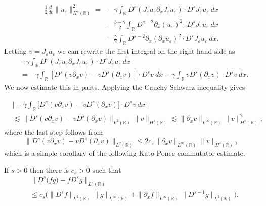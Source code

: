 \documentclass{beamer}
\newcommand{\rr}{\mathbb{R}}
\newcommand{\p}{\partial}
\newcommand{\ee}{\varepsilon}
\begin{document}
\begin{frame}
%
%
%
\begin{equation*} \begin{split}
\label{B-moli-int}
\frac 12
\frac{d}{dt} \|u_\ee \|_{H^s(\rr)}^2
=
& -
\gamma \int_{\rr}  D^s(J_\ee u_\ee \partial_x J_\ee u_\ee) \cdot
D^s J_\ee u_\ee  \  dx
\\
&- \frac{3 -\gamma}{2} \int_{\rr} D^{s-2} \p_x (u_{\ee})^2 \cdot D^s J_\ee 
u_{\ee} \ dx
\\
& - \frac{\gamma}{2} \int_{\rr}  D^{s-2} \p_x (\p_x u_\ee)^2
\cdot D^s J_\ee u_\ee  \ dx.
\end{split}
\end{equation*}
%
%
%
Letting $v=J_\ee u_\ee$ we can rewrite the first integral on the right-hand 
side as 
%
%
%
\begin{equation*} \begin{split}
\label{B-moli-int-v}
& -  \gamma \int_{\rr}   D^s (J_{\ee} u_{\ee} \p_x J_\ee u_\ee)
\cdot D^s
J_{\ee}u_\ee \ dx
\\
& = - \gamma \int_\rr
\left [ D^s(v\p_x v)  -  v D^s (\p_xv)
\right ] \cdot D^s v \ dx
- \gamma \int_\rr
v D^s (\p_xv) 
\cdot D^s v \ dx.
\end{split}
\end{equation*}
%
%
%
%
%
We now estimate this in parts. Applying the Cauchy-Schwarz 
inequality gives
%
%
%
\end{frame}

\begin{frame}

\begin{equation*} \label{int1-est-calc2}
\begin{split}
& \Big|
- \gamma \int_\rr
\big[ D^s(v\p_x v)  -  v D^s (\p_xv)
\big]
\cdot D^s v   \, dx
\Big|
\\
& \lesssim
\|
D^s(v\p_x v)  -  v D^s (\p_xv)
\|_{L^2(\rr)}
\|
v
\|_{H^s(\rr)}
\lesssim \| \p_x v \|_{L^\infty(\rr)} \| v \|_{H^s(\rr)}^2,
\end{split}
\end{equation*}
%
%
%
where the last step follows from 
%
%
%
\begin{equation*} \label{int1-est-calc3}
\| D^s(v\p_x v)  -  v D^s (\p_xv) \|_{L^2(\rr)}
\le
2 c_s    \| \p_x v \|_{L^\infty(\rr)} \| v \|_{H^s(\rr)},
\end{equation*}
%
%
which is a simple corollary of the following Kato-Ponce commutator 
estimate.
%
%
\begin{lemma} \label{KP-lemma}
If  $s>0$ then there is $c_s>0$ such that 
%
%
%
\begin{equation*} \begin{split}
& \| D^{s} \big(fg) -  f D^s g\|_{L^2(\rr)}
\\
& \le
c_s \big(
\| D^{s}f \|_{L^2(\rr)}    \| g \|_{L^\infty(\rr)} 
+ \| \p_xf \|_{L^\infty(\rr)}    \| D^{s-1}g \|_{L^2(\rr)}   \big).
\end{split}
\end{equation*}
%
%
%
\end{lemma}
%
%
\end{frame}
\end{document}
